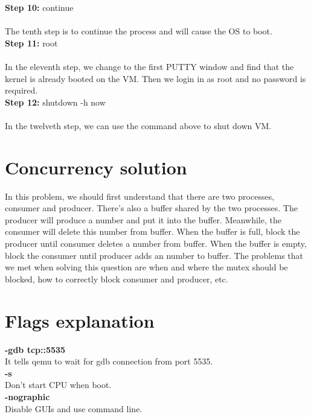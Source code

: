\documentclass[10pt,letterpaper,titlepage]{article}
\begin{document}
\textbf{Step 10:}
continue\\ \\
The tenth step is to continue the process and will cause the OS to boot. \\

\textbf{Step 11:}
root\\ \\
In the eleventh step, we change to the first PUTTY window and find that the kernel is already booted on the VM. Then we login in as root and no password is required.\\

\textbf{Step 12:}
shutdown -h now\\ \\
In the twelveth step, we can use the command above to shut down VM.\\
 

\section*{Concurrency solution}

\textbf{}
In this problem, we should first understand that there are two processes, consumer and producer. There's also a buffer shared by the two processes. The producer will produce a number and put it into the buffer. Meanwhile, the consumer will delete this number from buffer. When the buffer is full, block the producer until consumer deletes a number from buffer. When the buffer is empty, block the consumer until producer adds an number to buffer. The problems that we met when solving this question are when and where the mutex should be blocked, how to correctly block consumer and producer, etc. 
 
 
\section{Flags explanation}

\textbf{}

\textbf{-gdb tcp::5535}\\
It tells qemu to wait for gdb connection from port 5535.\\

\textbf{-s}\\ 
Don't start CPU when boot.\\
 
\textbf{-nographic}\\ 
Disable GUIs and use command line. \\
 
\end{document}
